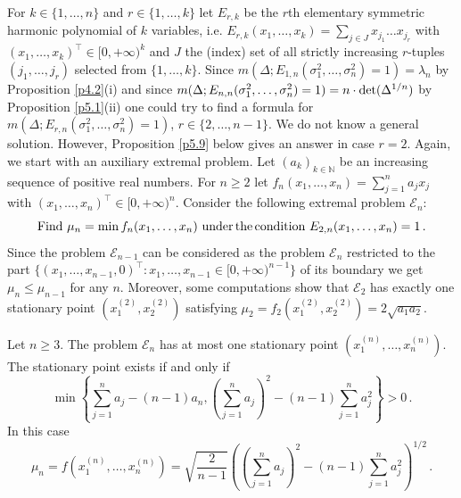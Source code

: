 \documentclass{amsart}
\begin{document}
For $k \in \{ 1,\ldots,n \}$ and $r \in \{ 1,\ldots,k \}$ let $E_{r,k}$ be the $r$th elementary symmetric harmonic polynomial of $k$ variables, i.e. $E_{r,k}(x_1,\ldots,x_k) = \sum_{j \in J} x_{j_1} \ldots x_{j_r}$ with $(x_1,\ldots,x_k)^\top \in [0,+\infty)^k$ and $J$ the (index) set of all strictly increasing $r$-tuples $(j_1,\ldots,j_r)$ selected from $\{ 1,\ldots,k \}$. Since $m(\Delta ; E_{1,n}(\sigma_1^2,\ldots,\sigma_n^2)=1)=\lambda_n$ by Proposition \ref{p4.2}(i) and since $m(\Delta ; E_{n,n}(\sigma_1^2,\ldots,\sigma_n^2)=1) = n \cdot {\rm det}(\Delta^{1/n})$ by Proposition \ref{p5.1}(ii) one could try to find a formula for $m(\Delta ; E_{r,n}(\sigma_1^2,\ldots,\sigma_n^2)=1)$, $r \in \{ 2,\ldots,n-1\}$. We do not know a general solution. However, Proposition \ref{p5.9} below gives an answer in case $r=2$. Again, we start with an auxiliary extremal problem. Let $(a_k)_{k \in \mathbb N}$ be an increasing sequence of positive real numbers. For $n \geq 2$ let $f_n(x_1,\ldots,x_n)=\sum_{j=1}^n a_jx_j$ with $(x_1,\ldots,x_n)^\top \in [0,+\infty)^n$. Consider the following extremal problem ${\mathcal E}_n$:
\begin{equation} \label{f5.16}
     {\rm Find} \,\, \mu_n = \min f_n(x_1,\ldots,x_n) \,\, {\rm under} \, {\rm the} \, {\rm condition} \,\, E_{2,n}(x_1,\ldots,x_n)=1 \, .
\end{equation}     
Since the problem ${\mathcal E}_{n-1}$ can be considered as the problem ${\mathcal E}_n$ restricted to the part $\{ (x_1,\ldots,x_{n-1},0)^\top : x_1,\ldots,x_{n-1} \in [0,+\infty)^{n-1} \}$ of its boundary we get $\mu_n \leq \mu_{n-1}$ for any $n$. Moreover, some computations show that ${\mathcal E}_2$ has exactly one stationary point $(x_1^{(2)},x_2^{(2)})$ satisfying $\mu_2 = f_2(x_1^{(2)},x_2^{(2)}) = 2 \sqrt{a_1a_2}$. 

\begin{lem} \label{l5.8}
   Let $n \geq 3$. The problem ${\mathcal E}_n$ has at most one stationary point $(x_1^{(n)},\ldots,x_n^{(n)} )$. The stationary point exists if and only if 
   \begin{equation}   \label{f5.17}
       \min \left\{ \sum_{j=1}^n a_j - (n-1) a_n , \left(\sum_{j=1}^n a_j \right)^2  - (n-1)\sum_{j=1}^n a_j^2 \right\} > 0 \, .
   \end{equation}
In this case
   \begin{equation}   \label{f5.18}
        \mu_n= f(x_1^{(n)},\ldots,x_n^{(n)}) = \sqrt{\frac{2}{n-1}} \left( \left(\sum_{j=1}^n a_j \right)^2 - (n-1) \sum_{j=1}^n a_j^2 \right)^{1/2} \, .
   \end{equation}     
\end{lem}
   
\end{document}
